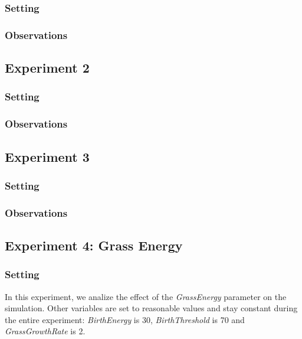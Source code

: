 \documentclass[11pt]{article}
\begin{document}
\subsubsection{Setting}

\subsubsection{Observations}

\subsection{Experiment 2}

\subsubsection{Setting}

\subsubsection{Observations}

\subsection{Experiment 3}

\subsubsection{Setting}

\subsubsection{Observations}





\subsection{Experiment 4: Grass Energy}

\subsubsection{Setting}
In this experiment, we analize the effect of the \textit{GrassEnergy} parameter on the simulation. Other variables are set to reasonable values and stay constant during the entire experiment: \textit{BirthEnergy} is 30, \textit{BirthThreshold} is 70 and \textit{GrassGrowthRate} is 2.
\end{document}
